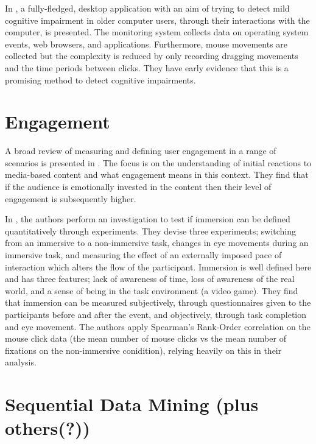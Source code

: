 \documentclass{llncs2e/llncs}
\begin{document}
  In \cite{gledson2016combining, bull2016combining}, a fully-fledged, desktop
  application with an aim of trying to detect mild cognitive impairment in older
  computer users, through their interactions with the computer, is presented.
  The monitoring system collects data on operating system events, web browsers,
  and applications. Furthermore, mouse movements are collected but the complexity
  is reduced by only recording dragging movements and the time periods between
  clicks. They have early evidence that this is a promising method to detect
  cognitive impairments.


  \section{Engagement}
  A broad review of measuring and defining user engagement in a range of scenarios
  is presented in \cite{brown_glancy}. The focus is on the understanding of initial
  reactions to media-based content and what engagement means in this context. They
  find that if the audience is emotionally invested in the content then their
  level of engagement is subsequently higher.

  In \cite{jennett2008measuring}, the authors perform an investigation to test
  if immersion can be defined quantitatively through experiments. They devise
  three experiments; switching from an immersive to a non-immersive task, changes
  in eye movements during an immersive task, and measuring the effect of an externally
  imposed pace of interaction which alters the flow of the participant. Immersion
  is well defined here and has three features; lack of awareness of time, loss of
  awareness of the real world, and a sense of being in the task environment (a video
  game). They find that immersion can be measured subjectively, through questionnaires
  given to the participants before and after the event, and objectively, through
  task completion and eye movement. The authors apply Spearman's Rank-Order correlation
  on the mouse click data (the mean number of mouse clicks vs the mean number of
  fixations on the non-immersive conidition), relying heavily on this in their
  analysis.

  \section{Sequential Data Mining (plus others(?))}

  
  
\end{document}
